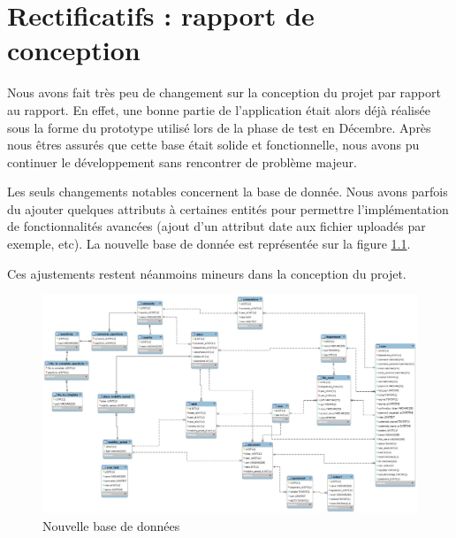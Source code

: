 \chapter{Rectificatifs : rapport de conception}

Nous avons fait très peu de changement sur la conception du projet par rapport au rapport. En effet, une bonne partie de l'application était alors déjà réalisée sous la forme du prototype utilisé lors de la phase de test en Décembre. Après nous êtres assurés que cette base était solide et fonctionnelle, nous avons pu continuer le développement sans rencontrer de problème majeur. 

Les seuls changements notables concernent la base de donnée. Nous avons parfois du ajouter quelques attributs à certaines entités pour permettre l'implémentation de fonctionnalités avancées (ajout d'un attribut date aux fichier uploadés par exemple, etc). La nouvelle base de donnée est représentée sur la figure \ref{bdd}.

Ces ajustements restent néanmoins mineurs dans la conception du projet.



\begin{figure}
	\centering
	\includegraphics[angle=90,scale=0.35]{images/screen_bdd.png}
	\caption{Nouvelle base de données}
	\label{bdd}
\end{figure}

